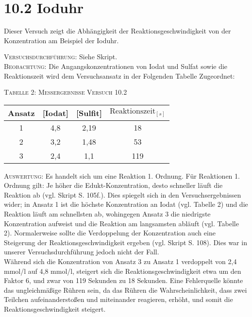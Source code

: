 \documentclass[11pt, a4paper]{article}
\begin{document}
\section{10.2 Ioduhr}

Dieser Versuch zeigt die Abhängigkeit der Reaktionsgeschwindigkeit von der Konzentration am Beispiel der Ioduhr. 

\textsc{Versuchsdurchführung:} Siehe Skript.\\

\textsc{Beobachtung:}\hspace{5mm} Die Angangskonzentrationen von Iodat und Sulfat sowie die Reaktionszeit wird dem Versuchsansatz in der Folgenden Tabelle Zugeordnet: \\
\begin{center}
\textsc{Tabelle 2: Messergebnisse Versuch 10.2}\\
\begin{tabular}{cccc}
Ansatz & [Iodat] & [Sulfit] & $\text{Reaktionszeit}_{[s]}$\\
\hline
1 & 4,8 & 2,19 & 18\\
2 & 3,2 & 1,48 & 53\\
3 & 2,4 & 1,1 & 119\\
\end{tabular}
\end{center}

\begin{flushleft}

\textsc{Auswertung:}\hspace{8mm} Es handelt sich um eine Reaktion 1. Ordnung. Für Reaktionen 1. Ordnung gilt: Je höher die Edukt-Konzentration, desto schneller läuft die Reaktion ab (vgl. Skript S. 105f.). Dies spiegelt sich in den Versuchsergebnissen\\ wider; in Ansatz 1 ist die höchste Konzentration an Iodat
(vgl. Tabelle 2) und die Reaktion läuft am schnellsten ab, wohingegen Ansatz 3 die niedrigste Konzentration aufweist und die Reaktion am langsamsten abläuft (vgl. Tabelle 2). 
Normalerweise sollte die Verdoppelung der Konzentration auch eine Steigerung der Reaktionsgeschwindigkeit ergeben (vgl. Skript S. 108).  Dies war in unserer Versuchsdurchführung jedoch nicht der Fall.\\ Während  sich die Konzentration von Ansatz 3 zu Ansatz 1 verdoppelt von 2,4 mmol/l auf 4,8 mmol/l, steigert sich die Reaktionsgeschwindigkeit etwa um den Faktor 6, und zwar von 119 Sekunden zu 18 Sekunden. 
Eine Fehlerquelle könnte das ungleichmäßige Rühren sein, da das Rühren die Wahrscheinlichkeit, dass zwei Teilchen aufeinanderstoßen und miteinander reagieren, erhöht, und somit die Reaktionsgeschwindigkeit steigert.
\end{flushleft}
\end{document}
